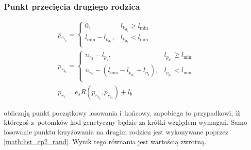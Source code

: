 \subsubsection{Punkt przecięcia drugiego rodzica}
\label{subsubsec:list_cp2}
\vspace{-\parskip}
\begin{fleqn}
  \begin{gather}
    \label{math:list_cp2_p}
    p_{r_{2_p}}=\begin{cases}
      0
        ,& l_{k_{d_2}} \geqslant l_{\min}\\
      l_{\min}-l_{k_{d_2}}
        ,& l_{k_{d_2}}<l_{\min}\\
    \end{cases}\\
    \label{math:list_cp2_k}
    p_{r_{2_k}}=\begin{cases}
      n_{r_2}-l_{p_b}
        ,& l_{p_{d_1}} \geqslant l_{\min}\\
      n_{r_2}-\left(l_{\min}-l_{p_{d_1}}+l_{p_b}\right)
        ,& l_{p_{d_1}}<l_{\min}\\
    \end{cases}\\
    \label{math:list_cp2_rand}
    p_{r_2}=e_s R\left(p_{r_{2_p}}, p_{r_{2_k}}\right)
      +l_b
  \end{gather}
\end{fleqn}
 obliczają punkt
początkowy losowania i~końcowy, zapobiega to przypadkowi,
iż któregoś z~potomków kod genetyczny
będzie za krótki względem wymagań.
Samo losowanie punktu krzyżowania na drugim rodzicu
jest wykonywane poprzez \cref{math:list_cp2_rand}.
Wynik tego równania jest wartością zwrotną.

